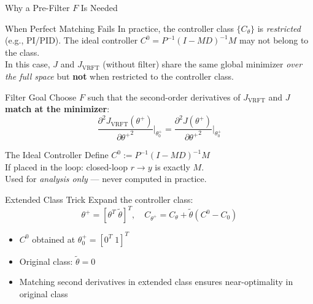 \documentclass[hyperref={pdfpagemode=FullScreen},aspectratio=169]{beamer}
\newcommand{\JJ}{J_{\mathrm{VRFT}}}
\newcommand{\Jopt}{J}
\begin{document}
\begin{frame}{Why a Pre-Filter $F$ Is Needed}
      \begin{alertblock}{When Perfect Matching Fails}
        In practice, the controller class $\{C_\theta\}$ is \emph{restricted} (e.g., PI/PID). The ideal controller $C^0 = P^{-1}(I-MD)^{-1}M$ may not belong to the class.\\[0.4em]
        In this case, $\Jopt$ and $\JJ$ (without filter) share the same global minimizer \emph{over the full space} but \textbf{not} when restricted to the controller class.
      \end{alertblock}
      \vspace{0.3em}
      \begin{block}{Filter Goal}
        Choose $F$ such that the second-order derivatives of $\JJ$ and $\Jopt$ \textbf{match at the minimizer}:
        \[
          \frac{\partial^2 \JJ(\theta^+)}{\partial{\theta^+}^2}\Bigg|_{\theta^+_0}
          = \frac{\partial^2 \Jopt(\theta^+)}{\partial{\theta^+}^2}\Bigg|_{\theta^+_0}
        \]
      \end{block}

\end{frame}
\begin{frame}
      \begin{block}{The Ideal Controller}
        Define $C^0 := P^{-1}(I-MD)^{-1}M$\\[0.3em]
        If placed in the loop: closed-loop $r \to y$ is exactly $M$.\\[0.3em]
        Used for \emph{analysis only} --- never computed in practice.
      \end{block}
      \vspace{0.3em}
      \begin{exampleblock}{Extended Class Trick}
        Expand the controller class:
        \[ \theta^+ = [\theta^T\;\tilde\theta]^T, \quad C_{\theta^+} = C_\theta + \tilde\theta(C^0 - C_0) \]
        \begin{itemize}
          \item $C^0$ obtained at $\theta^+_0 = [0^T\;1]^T$
          \item Original class: $\tilde\theta = 0$
          \item Matching second derivatives in extended class ensures near-optimality in original class
        \end{itemize}
      \end{exampleblock}
\end{frame}
\end{document}
